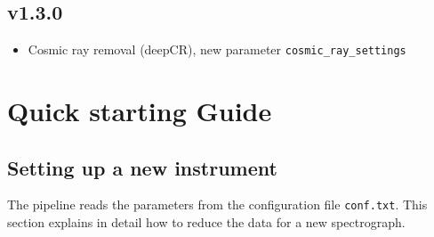 \documentclass[10pt,a4paper]{article}
\begin{document}
\subsection*{v1.3.0}
\begin{itemize}\setlength\itemsep{0em}
  \item Cosmic ray removal (deepCR), new parameter \verb|cosmic_ray_settings|
\end{itemize}


\section{Quick starting Guide}

\subsection{Setting up a new instrument}
\label{Section:first_configuration}
The pipeline reads the parameters from the configuration file \verb|conf.txt|. This section explains in detail how to reduce the data for a new spectrograph.
\end{document}

